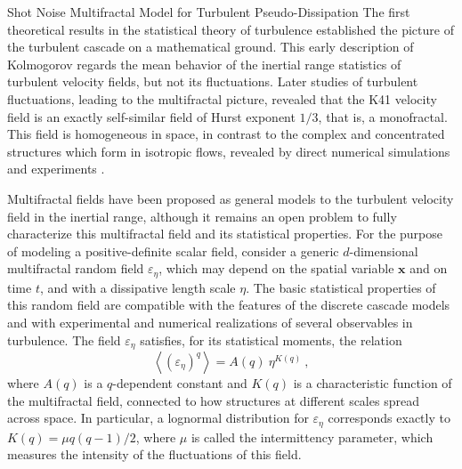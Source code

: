 \begin{chapter}{Shot Noise Multifractal Model for Turbulent Pseudo-Dissipation}
The first theoretical results in the statistical theory of turbulence established the picture of the turbulent cascade on a mathematical ground. This early description of Kolmogorov regards the mean behavior of the inertial range statistics of turbulent velocity fields, but not its fluctuations. Later studies of turbulent fluctuations, leading to the multifractal picture,
revealed that the K41 velocity field is an exactly self-similar field of Hurst exponent $1/3$, that is, a monofractal. This field is homogeneous in space, in contrast to the complex and concentrated structures which form in isotropic flows, revealed by direct numerical simulations and experiments \parencite{ishihara2009,debue2018prf,dubrulle2019beyond}.

Multifractal fields have been proposed as general models to the  turbulent velocity field in the inertial range, although it remains an open problem to fully characterize this multifractal field and its statistical properties.
For the purpose of modeling a positive-definite scalar field, consider a generic $d$-dimensional multifractal random field $\varepsilon_{\eta}$, which may depend on the spatial variable $\boldsymbol{x}$ and on time $t$, and with a dissipative length scale $\eta$.
The basic statistical properties of this random field are compatible with the features of the discrete cascade models and with experimental and numerical realizations of several observables in turbulence.
The field $\varepsilon_{\eta}$ satisfies, for its statistical moments, the relation
\begin{equation} \label{eq:bare-moments}
\left\langle(\varepsilon_{\eta})^{q}\right\rangle = A(q) \ \eta^{K(q)} \ ,
\end{equation}
where $A(q)$ is a $q$-dependent constant and $K(q)$ is a characteristic function of the multifractal field, connected to how structures at different scales spread across space.
In particular, a lognormal distribution for $\varepsilon_{\eta}$ corresponds exactly to $K(q) = \mu q (q-1) / 2$, where $\mu$ is called the intermittency parameter, which measures the intensity of the fluctuations of this field.


\end{chapter}
